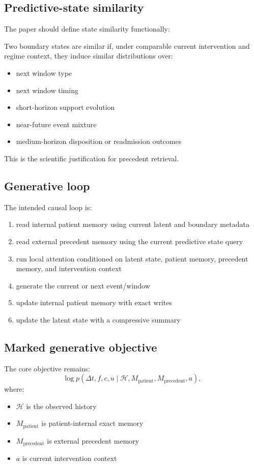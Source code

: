 \documentclass[11pt]{article}
\begin{document}
\subsection{Predictive-state similarity}

The paper should define state similarity functionally:

Two boundary states are similar if, under comparable current intervention and
regime context, they induce similar distributions over:
\begin{itemize}
    \item next window type
    \item next window timing
    \item short-horizon support evolution
    \item near-future event mixture
    \item medium-horizon disposition or readmission outcomes
\end{itemize}

This is the scientific justification for precedent retrieval.

\subsection{Generative loop}

The intended causal loop is:
\begin{enumerate}
    \item read internal patient memory using current latent and boundary metadata
    \item read external precedent memory using the current predictive state query
    \item run local attention conditioned on latent state, patient memory, precedent memory, and intervention context
    \item generate the current or next event/window
    \item update internal patient memory with exact writes
    \item update the latent state with a compressive summary
\end{enumerate}

\subsection{Marked generative objective}

The core objective remains:
\[
    \log p(\Delta t, f, c, u \mid \mathcal{H}, M_{\text{patient}}, M_{\text{precedent}}, a),
\]
where:
\begin{itemize}
    \item $\mathcal{H}$ is the observed history
    \item $M_{\text{patient}}$ is patient-internal exact memory
    \item $M_{\text{precedent}}$ is external precedent memory
    \item $a$ is current intervention context
\end{itemize}
\end{document}
